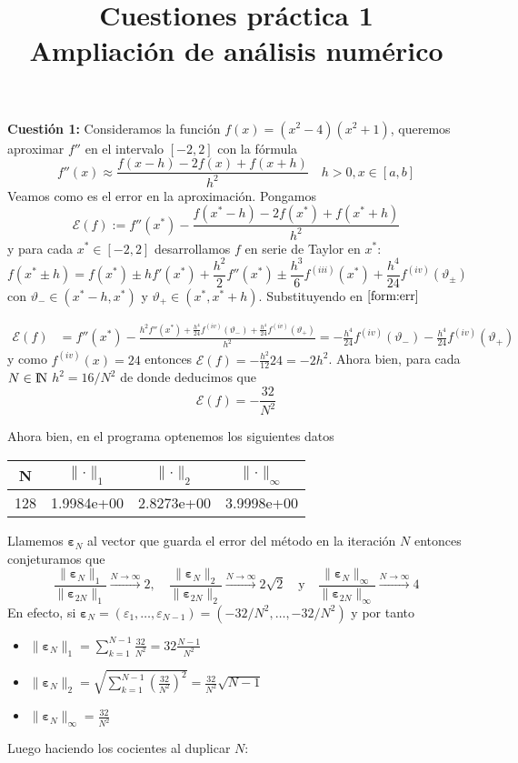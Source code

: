 \documentclass[12pt]{article}
\title{\textbf{Cuestiones práctica 1\\ {\small Ampliación de análisis numérico}}}
\date{}
\author{}
\newcommand{\NN}{{\rm I\!N}}
\newcommand{\norm}[1]{\lVert #1\rVert}
\theoremstyle{definition}
\begin{document}
\maketitle
\noindent 
\textbf{Cuestión 1:} Consideramos la función $f(x) = (x^2 - 4)(x^2 + 1)$, queremos aproximar $f''$ en el intervalo $[-2,2]$ con la fórmula 
$$f''(x) \approx \frac{f(x - h) -2 f(x) + f(x + h)}{h^2} \quad h>0, x\in [a,b]$$
Veamos como es el error en la aproximación. Pongamos
\begin{equation}\tag{$\ast$}\label{form:err}
	\mathcal{E}(f) := f''(x^*) - \frac{f(x^* - h) -2 f(x^*) + f(x^* + h)}{h^2}
\end{equation}
y para cada $x^*\in [-2, 2]$ desarrollamos $f$ en serie de Taylor en $x^*$:
$$f(x^* \pm h) = f(x^*) \pm h f'(x^*) + \frac{h^2}{2}f''(x^*) \pm \frac{h^3}{6}f^{(iii)}(x^*) + \frac{h^4}{24}f^{(iv)}(\vartheta_\pm)$$
con $\vartheta_- \in (x^* - h, x^*)$ y $\vartheta_+ \in (x^*, x^* + h)$. Substituyendo en $\eqref{form:err}$

\begin{align*}
	\mathcal{E}(f) &= f''(x^*) - \frac{h^2f''(x^*) + \frac{h^4}{24}f^{(iv)}(\vartheta_-) + \frac{h^4}{24}f^{(iv)}(\vartheta_+)}{h^2} = -\frac{h^4}{24}f^{(iv)}(\vartheta_-) - \frac{h^4}{24}f^{(iv)}(\vartheta_+)
\end{align*}
y como $f^{(iv)}(x)=24$ entonces $\mathcal{E}(f) = -\frac{h^2}{12}24 = -2h^2$. Ahora bien, para cada $N\in\NN$ $h^2 = 16 /N^2$ de donde deducimos que 
$$\boxed{\mathcal{E}(f) = -\frac{32}{N^2}}$$

\noindent Ahora bien, en el programa optenemos los siguientes datos
\begin{center}
	\begin{tabular}{ ||c | c | c | c ||}
		\hline
		N & $\norm{\cdot}_1$ & $\norm{\cdot}_2$ & $\norm{\cdot}_\infty$ \\
		\hline\hline
		128 & 1.9984e+00 & 2.8273e+00 & 3.9998e+00 \\
		\hline
	\end{tabular}
\end{center}
Llamemos $\bm{\varepsilon}_N$ al vector que guarda el error del método en la iteración $N$ entonces conjeturamos que 
$$\frac{\norm{\bm{\varepsilon}_N}_1}{\norm{\bm{\varepsilon}_{2N}}_1} \stackrel{N\to\infty}{\longrightarrow} 2, \quad \frac{\norm{\bm{\varepsilon}_N}_2}{\norm{\bm{\varepsilon}_{2N}}_2} \stackrel{N\to\infty}{\longrightarrow} 2 \sqrt{2}\quad \text{y}\quad \frac{\norm{\bm{\varepsilon}_N}_\infty}{\norm{\bm{\varepsilon}_{2N}}_\infty} \stackrel{N\to\infty}{\longrightarrow}4$$
En efecto, si $\bm{\varepsilon}_N = (\varepsilon_1, \dots, \varepsilon_{N-1}) = (-32/N^2, \dots, -32/N^2)$ y por tanto
\begin{itemize}
	\item $\displaystyle \norm{\bm{\varepsilon}_N}_1 = \sum_{k=1}^{N-1}\frac{32}{N^2} = 32 \frac{N-1}{N^2}$
	\item $\displaystyle \norm{\bm{\varepsilon}_N}_2 = \sqrt{\sum_{k=1}^{N-1}\left(\frac{32}{N^2}\right)^2} = \frac{32}{N^2} \sqrt{N-1}$
	\item $\displaystyle \norm{\bm{\varepsilon}_N}_\infty = \frac{32}{N^2}$
\end{itemize}
Luego haciendo los cocientes al duplicar $N$:
\end{document}
